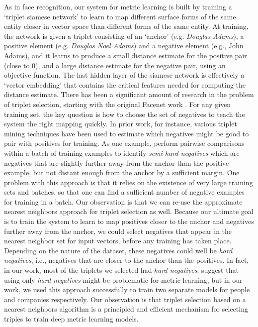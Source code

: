 As in face recognition, our system for metric learning is built by training a `triplet siamese network' to learn to map different surface forms of the same entity closer in vector space than different forms of the same entity.  At training, the network is given a triplet consisting of an `anchor' (e.g. \textit{Douglas Adams}), a positive element (e.g. \textit{Douglas Noel Adams}) and a negative element (e.g., John Adams), and it learns to produce a small distance estimate for the positive pair (close to 0), and a large distance estimate for the negative pair, using an objective function. The last hidden layer of the siamese network is effectively a `vector embedding' that contains the critical features needed for computing the distance estimate.  There has been a significant amount of research in the problem of triplet selection, starting with the original Facenet work \cite{DBLP:conf/cvpr/SchroffKP15}.  For any given training set, the key question is how to choose the set of negatives to teach the system the right mapping quickly.  In prior work, for instance, various triplet mining techniques have been used to estimate which negatives might be good to pair with positives for training.  As one example, \cite{DBLP:conf/cvpr/SchroffKP15} perform pairwise comparisons within a batch of training examples to identify \textit{semi-hard negatives} which are negatives that are slightly further away from the anchor than the positive example, but not distant enough from the anchor by a sufficient margin.  One problem with this approach is that it relies on the existence of very large training sets and batches, so that one can find a sufficient number of negative examples for training in a batch.  Our observation is that we can re-use the approximate nearest neighbors approach for triplet selection as well.  Because our ultimate goal is to train the system to learn to map positives closer to the anchor and negatives further away from the anchor, we could select negatives that appear in the nearest neighbor set for input vectors, before any training has taken place.  Depending on the nature of the dataset, these negatives could well be \textit{hard negatives}, i.e., negatives that are closer to the anchor than the positives.  In fact, in our work, most of the triplets we selected had \textit{hard negatives}.  \cite{DBLP:conf/cvpr/SchroffKP15} suggest that using only \textit{hard negatives} might be problematic for metric learning, but in our work, we used this approach successfully to train two separate models for people and companies respectively.  Our observation is that triplet selection based on a nearest neighbors algorithm is a principled and efficient mechanism for selecting triples to train deep metric learning models.

